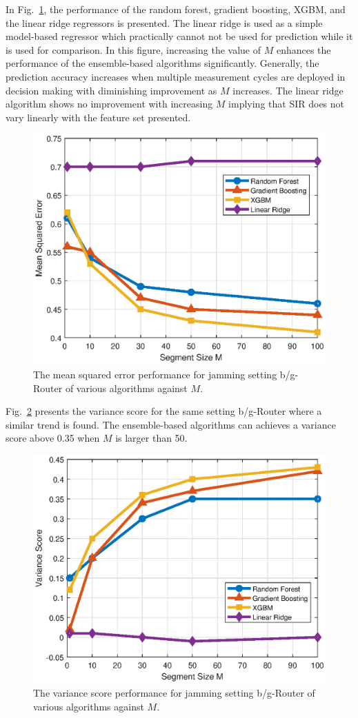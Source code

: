 In Fig.~\ref{ftml-jrnl:fig:001_MSE_M}, the performance of the random forest, gradient boosting, XGBM, and the linear ridge regressors is presented. The linear ridge is used as a simple model-based regressor which practically cannot not be used for prediction while it is used for comparison. In this figure, increasing the value of $M$ enhances the performance of the ensemble-based algorithms significantly. Generally, the prediction accuracy increases when multiple measurement cycles are deployed in decision making with diminishing improvement as $M$ increases.  The linear ridge algorithm shows no improvement with increasing $M$ implying that SIR does not vary linearly with the feature set presented.

\begin{figure}[!ht]
	\centering
	\includegraphics[width=0.75\columnwidth]{./chapter-ftml/plots/001_MSE_M.eps}
	\caption{The mean squared error performance for jamming setting b/g-Router of various algorithms against $M$.}
	\label{ftml-jrnl:fig:001_MSE_M}      
\end{figure}

Fig.~\ref{ftml-jrnl:fig:001_R2_M} presents the variance score for the same setting b/g-Router where a similar trend is found. The ensemble-based algorithms can achieves a variance score above 0.35 when $M$ is larger than 50. 

\begin{figure}[!ht]
	\centering
	\includegraphics[width=0.75\columnwidth]{./chapter-ftml/plots/001_R2_M.eps}
	\caption{The variance score performance for jamming setting b/g-Router of various algorithms against $M$.}
	\label{ftml-jrnl:fig:001_R2_M}      
\end{figure}

